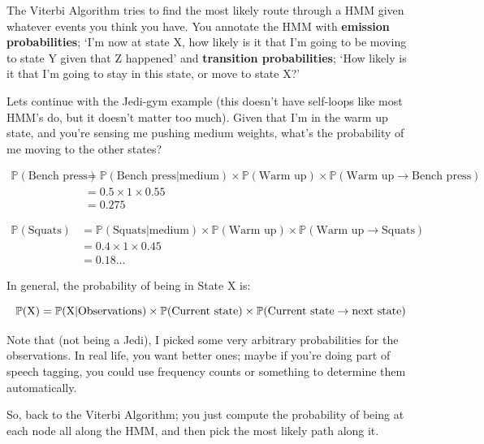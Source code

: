The Viterbi Algorithm tries to find the most likely route through a HMM given
whatever events you think you have. You annotate the HMM with \textbf{emission
probabilities}; `I'm now at state X, how likely is it that I'm going to be
moving to state Y given that Z happened' and \textbf{transition probabilities};
`How likely is it that I'm going to stay in this state, or move to state X?'

Lets continue with the Jedi-gym example (this doesn't have self-loops like most
HMM's do, but it doesn't matter too much). Given that I'm in the warm up state,
and you're sensing me pushing medium weights, what's the probability of me
moving to the other states?

\[
  \begin{split}
  \mathbb{P}(\text{Bench press}) &=
        \mathbb{P}(\text{Bench press} | \text{medium})  \times
        \mathbb{P}(\text{Warm up}) \times
        \mathbb{P}(\text{Warm up} \rightarrow \text{Bench press})\\
      &= 0.5 \times 1 \times 0.55\\
      &= 0.275
  \end{split}
\]

\[
  \begin{split}
  \mathbb{P}(\text{Squats}) &=
        \mathbb{P}(\text{Squats} | \text{medium})  \times
        \mathbb{P}(\text{Warm up}) \times
        \mathbb{P}(\text{Warm up} \rightarrow \text{Squats})\\
      &= 0.4 \times 1 \times 0.45\\
      &= 0.18\dots
  \end{split}
\]

In general, the probability of being in State X is:

\[
  \mathbb{P}(\text{X}) =
      \mathbb{P}(\text{X} | \text{Observations})  \times
      \mathbb{P}(\text{Current state}) \times
      \mathbb{P}(\text{Current state} \rightarrow \text{next state})\\
\]

Note that (not being a Jedi), I picked some very arbitrary probabilities for the
observations. In real life, you want better ones; maybe if you're doing part of
speech tagging, you could use frequency counts or something to determine them
automatically.

So, back to the Viterbi Algorithm; you just compute the probability of being at
each node all along the HMM, and then pick the most likely path along it.

